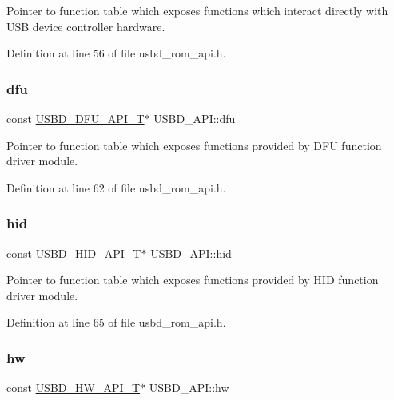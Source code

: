 Pointer to function table which exposes functions which interact directly with U\+SB device controller hardware. 

Definition at line 56 of file usbd\+\_\+rom\+\_\+api.\+h.

\mbox{\label{struct_u_s_b_d___a_p_i_ade2d145690a4684babfc683b9cdec47f}} 
\subsubsection{\texorpdfstring{dfu}{dfu}}
{\footnotesize\ttfamily const \hyperlink{group___u_s_b_d___d_f_u_gadf9281f8af1223053e3ccf48e26ac80d}{U\+S\+B\+D\+\_\+\+D\+F\+U\+\_\+\+A\+P\+I\+\_\+T}$\ast$ U\+S\+B\+D\+\_\+\+A\+P\+I\+::dfu}

Pointer to function table which exposes functions provided by D\+FU function driver module. 

Definition at line 62 of file usbd\+\_\+rom\+\_\+api.\+h.

\mbox{\label{struct_u_s_b_d___a_p_i_add4c43d092004fe92e77152d970e877b}} 
\subsubsection{\texorpdfstring{hid}{hid}}
{\footnotesize\ttfamily const \hyperlink{group___u_s_b_d___h_i_d_ga48d7b7f66a852d99dfbe2c419cc408ba}{U\+S\+B\+D\+\_\+\+H\+I\+D\+\_\+\+A\+P\+I\+\_\+T}$\ast$ U\+S\+B\+D\+\_\+\+A\+P\+I\+::hid}

Pointer to function table which exposes functions provided by H\+ID function driver module. 

Definition at line 65 of file usbd\+\_\+rom\+\_\+api.\+h.

\mbox{\label{struct_u_s_b_d___a_p_i_a80f452bd8ff7fdff6fb835beb5e3255c}} 
\subsubsection{\texorpdfstring{hw}{hw}}
{\footnotesize\ttfamily const \hyperlink{group___u_s_b_d___h_w_ga4df5b7beaddc4e9267c320d92b4434fc}{U\+S\+B\+D\+\_\+\+H\+W\+\_\+\+A\+P\+I\+\_\+T}$\ast$ U\+S\+B\+D\+\_\+\+A\+P\+I\+::hw}

